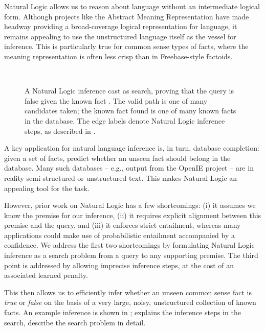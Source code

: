 Natural Logic allows us to reason about language without
  an intermediate logical form.
Although projects like the Abstract Meaning Representation
  \cite{key:2013banarescu-amr} have made headway providing a
  broad-coverage logical representation for language, it remains 
  appealing to use the unstructured language itself as the vessel for
  inference.
This is particularly true for common sense types of facts, where
  the meaning representation is often less crisp than in Freebase-style
  factoids.

\begin{figure}[th]
\begin{center}
  \resizebox{0.48\textwidth}{!}{\teaserSearch} \\
\end{center}
\caption{
  A Natural Logic inference cast as search, proving that the
    query  is false given the known fact
    .
  The valid path is one of many candidates taken; the known fact found
    is one of many known facts in the database.
  The edge labels denote Natural Logic inference steps, as
    described in .
  \label{fig:teaser}
}
\end{figure}

A key application for natural language inference is, in turn,
  database completion: given a set of facts, predict whether an
  unseen fact should belong in the database.
Many such databases -- e.g., output from the OpenIE
  project \cite{key:2007banko-openie} -- are in reality semi-structured
  or unstructured text.
This makes Natural Logic an appealing tool for the task.

However, prior work on Natural Logic has a few shortcomings:
  (i) it assumes we know the premise for our inference,
  (ii) it requires explicit alignment between this premise and the
       query,
  and (iii) it enforces strict entailment, whereas many applications
    could make use of probabilistic entailment accompanied by a
    confidence.
We address the first two shortcomings by formulating Natural Logic
  inference as a search problem from a query to any supporting
  premise.
The third point is addressed by allowing imprecise inference steps,
  at the cost of an associated learned penalty.

This then allows us to efficiently infer whether an unseen
  common sense fact is \textit{true} or \textit{false} on the basis
  of a very large, noisy, unstructured collection of known facts.
An example inference is shown in ;
   explains the inference steps in the search,
   describe the search problem in detail.

